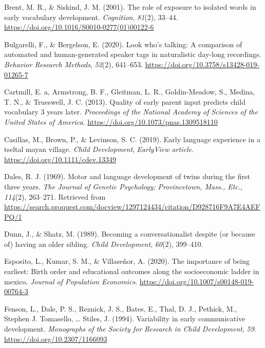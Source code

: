 \documentclass[
  english,
  man,floatsintext]{apa6}
\begin{document}
\leavevmode\hypertarget{ref-brent_role_2001}{}%
Brent, M. R., \& Siskind, J. M. (2001). The role of exposure to isolated words in early vocabulary development. \emph{Cognition}, \emph{81}(2), 33--44. \url{https://doi.org/10.1016/S0010-0277(01)00122-6}

\leavevmode\hypertarget{ref-bulgarelli_look_2020}{}%
Bulgarelli, F., \& Bergelson, E. (2020). Look who's talking: A comparison of automated and human-generated speaker tags in naturalistic day-long recordings. \emph{Behavior Research Methods}, \emph{52}(2), 641--653. \url{https://doi.org/10.3758/s13428-019-01265-7}

\leavevmode\hypertarget{ref-cartmill_quality_2013}{}%
Cartmill, E. a, Armstrong, B. F., Gleitman, L. R., Goldin-Meadow, S., Medina, T. N., \& Trueswell, J. C. (2013). Quality of early parent input predicts child vocabulary 3 years later. \emph{Proceedings of the National Academy of Sciences of the United States of America}. \url{https://doi.org/10.1073/pnas.1309518110}

\leavevmode\hypertarget{ref-casillas_early_2019}{}%
Casillas, M., Brown, P., \& Levinson, S. C. (2019). Early language experience in a tseltal mayan village. \emph{Child Development}, \emph{EarlyView article}. \url{https://doi.org/10.1111/cdev.13349}

\leavevmode\hypertarget{ref-dales_motor_1969}{}%
Dales, R. J. (1969). Motor and language development of twins during the first three years. \emph{The Journal of Genetic Psychology; Provincetown, Mass., Etc.}, \emph{114}(2), 263--271. Retrieved from \url{https://search.proquest.com/docview/1297124434/citation/D928716F9A7E4AEFPQ/1}

\leavevmode\hypertarget{ref-dunn_becoming_1989}{}%
Dunn, J., \& Shatz, M. (1989). Becoming a conversationalist despite (or because of) having an older sibling. \emph{Child Development}, \emph{60}(2), 399--410.

\leavevmode\hypertarget{ref-esposito_importance_2020}{}%
Esposito, L., Kumar, S. M., \& Villaseñor, A. (2020). The importance of being earliest: Birth order and educational outcomes along the socioeconomic ladder in mexico. \emph{Journal of Population Economics}. \url{https://doi.org/10.1007/s00148-019-00764-3}

\leavevmode\hypertarget{ref-fenson_variability_1994}{}%
Fenson, L., Dale, P. S., Reznick, J. S., Bates, E., Thal, D. J., Pethick, M., Stephen J. Tomasello, \ldots{} Stiles, J. (1994). Variability in early communicative development. \emph{Monographs of the Society for Research in Child Development}, \emph{59}. \url{https://doi.org/10.2307/1166093}
\end{document}
